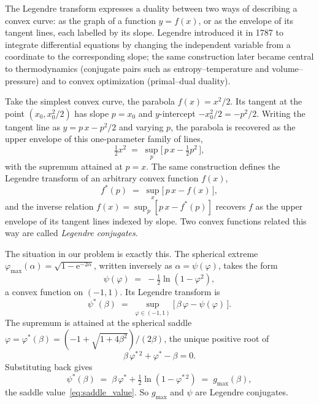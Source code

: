 \documentclass[letterpaper]{article} %
\newcommand{\e}{{\mathrm{e}}}
\newcommand{\Bnet}{\beta}
\begin{document}
The Legendre transform expresses a duality between two ways of describing a convex
curve: as the graph of a function $y = f(x)$, or as the envelope of its tangent
lines, each labelled by its slope. Legendre introduced it in 1787 to integrate
differential equations by changing the independent variable from a coordinate to
the corresponding slope; the same construction later became central to
thermodynamics (conjugate pairs such as entropy--temperature and volume--pressure)
and to convex optimization (primal--dual duality).

Take the simplest convex curve, the parabola $f(x) = x^2/2$. Its tangent at the
point $(x_0, x_0^2/2)$ has slope $p = x_0$ and $y$-intercept $-x_0^2/2 = -p^2/2$.
Writing the tangent line as $y = p\,x - p^2/2$ and varying $p$, the parabola is
recovered as the upper envelope of this one-parameter family of lines,
\begin{equation}
\tfrac12 x^2 \;=\; \sup_p \bigl[\,p\,x - \tfrac12 p^2\,\bigr],
\end{equation}
with the supremum attained at $p = x$. The same construction defines the Legendre
transform of an arbitrary convex function $f(x)$,
\begin{equation}
f^*(p) \;=\; \sup_x \bigl[\,p\,x - f(x)\,\bigr],
\end{equation}
and the inverse relation $f(x) = \sup_p [p\,x - f^*(p)]$ recovers $f$ as the upper
envelope of its tangent lines indexed by slope. Two convex functions related this
way are called \emph{Legendre conjugates}.

The situation in our problem is exactly this. The spherical extreme
$\varphi_{\max}(\alpha) = \sqrt{1-\e^{-2\alpha}}$, written inversely as
$\alpha = \psi(\varphi)$, takes the form
\begin{equation}
\psi(\varphi) \;=\; -\tfrac12 \ln(1-\varphi^2),
\end{equation}
a convex function on $(-1, 1)$. Its Legendre transform is
\begin{equation}
\psi^*(\Bnet) \;=\; \sup_{\varphi \in (-1, 1)} \bigl[\,\Bnet\,\varphi - \psi(\varphi)\,\bigr].
\end{equation}
The supremum is attained at the spherical saddle
$\varphi = \varphi^*(\Bnet) = (-1 + \sqrt{1+4\Bnet^2})/(2\Bnet)$, the unique
positive root of
\begin{equation}
\Bnet\,\varphi^{*\,2} + \varphi^* - \Bnet = 0.
\end{equation}
Substituting back gives
\begin{equation}
\psi^*(\Bnet) \;=\; \Bnet\,\varphi^* + \tfrac12 \ln(1-\varphi^{*\,2})
\;=\; g_{\max}(\Bnet),
\label{eq:legendre}
\end{equation}
the saddle value~\eqref{eq:saddle_value}. So $g_{\max}$ and $\psi$ are Legendre
conjugates.
\end{document}
